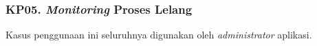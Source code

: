 \subsubsection{KP05. \textit{Monitoring} Proses Lelang}
\label{kp05}

	Kasus penggunaan ini seluruhnya digunakan oleh \textit{administrator} aplikasi.

	
	
	
	
	